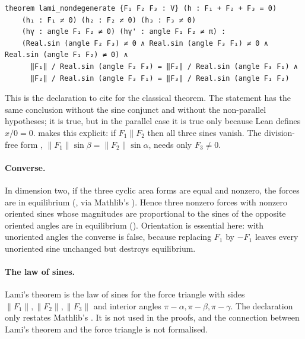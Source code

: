 \documentclass[11pt]{article}
\theoremstyle{definition}
\theoremstyle{remark}
\begin{document}
\begin{lstlisting}
theorem lami_nondegenerate {F₁ F₂ F₃ : V} (h : F₁ + F₂ + F₃ = 0)
    (h₁ : F₁ ≠ 0) (h₂ : F₂ ≠ 0) (h₃ : F₃ ≠ 0)
    (hγ : angle F₁ F₂ ≠ 0) (hγ' : angle F₁ F₂ ≠ π) :
    (Real.sin (angle F₂ F₃) ≠ 0 ∧ Real.sin (angle F₃ F₁) ≠ 0 ∧ Real.sin (angle F₁ F₂) ≠ 0) ∧
      ‖F₁‖ / Real.sin (angle F₂ F₃) = ‖F₂‖ / Real.sin (angle F₃ F₁) ∧
      ‖F₂‖ / Real.sin (angle F₃ F₁) = ‖F₃‖ / Real.sin (angle F₁ F₂)
\end{lstlisting}

This is the declaration to cite for the classical theorem. The statement  has the
same conclusion without the sine conjunct and without the non-parallel hypotheses; it is true, but
in the parallel case it is true only because Lean defines $x/0=0$. 
makes this explicit: if $F_1\parallel F_2$ then all three sines vanish. The division-free form
, $\|F_1\|\sin\beta=\|F_2\|\sin\alpha$, needs only $F_3\ne0$.

\paragraph{Converse.} In dimension two, if the three cyclic area forms are equal and nonzero, the
forces are in equilibrium (, via Mathlib's
). Hence three nonzero forces with nonzero oriented sines
whose magnitudes are proportional to the sines of the opposite oriented angles are in equilibrium
(). Orientation is essential here: with unoriented angles the
converse is false, because replacing $F_1$ by $-F_1$ leaves every unoriented sine unchanged but
destroys equilibrium.

\paragraph{The law of sines.} Lami's theorem is the law of sines for the force triangle with sides
$\|F_1\|,\|F_2\|,\|F_3\|$ and interior angles $\pi-\alpha,\pi-\beta,\pi-\gamma$. The declaration
 only restates Mathlib's
. It is not used in the
proofs, and the connection between Lami's theorem and the force triangle is not formalised.
\end{document}
